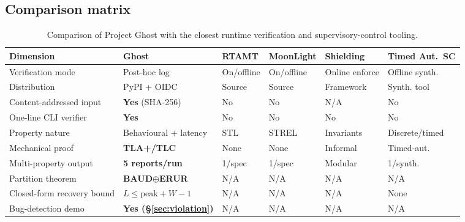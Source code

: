 \documentclass[11pt,a4paper]{article}
\begin{document}
\subsection{Comparison matrix}
\label{sec:comparison}

\begin{table}[h]
\centering
\small
\setlength{\tabcolsep}{4pt}
\begin{tabularx}{\linewidth}{l X X X X X}
\toprule
\textbf{Dimension} & \textbf{Ghost} & \textbf{RTAMT} & \textbf{MoonLight} & \textbf{Shielding} & \textbf{Timed Aut.~SC} \\
\midrule
Verification mode             & Post-hoc log              & On/offline      & On/offline      & Online enforce & Offline synth.\\
Distribution                  & PyPI + OIDC               & Source          & Source          & Framework       & Synth. tool   \\
Content-addressed input       & \textbf{Yes} (SHA-256)    & No              & No              & N/A             & No            \\
One-line CLI verifier         & \textbf{Yes}              & No              & No              & No              & No            \\
Property nature               & Behavioural + latency     & STL             & STREL           & Invariants      & Discrete/timed\\
Mechanical proof              & \textbf{TLA+/TLC}         & None            & None            & Informal        & Timed-aut.    \\
Multi-property output         & \textbf{5 reports/run}    & 1/spec          & 1/spec          & Modular         & 1/synth.      \\
Partition theorem             & \textbf{BAUD$\oplus$ERUR} & N/A             & N/A             & N/A             & N/A           \\
Closed-form recovery bound    & \textbf{$L\le \mathrm{peak}+W-1$} & N/A     & N/A             & N/A             & None          \\
Bug-detection demo            & \textbf{Yes (\S\ref{sec:violation})} & N/A  & N/A             & N/A             & N/A           \\
\bottomrule
\end{tabularx}
\caption{Comparison of Project Ghost with the closest runtime
         verification and supervisory-control tooling.}
\label{tab:comparison}
\end{table}
\end{document}
